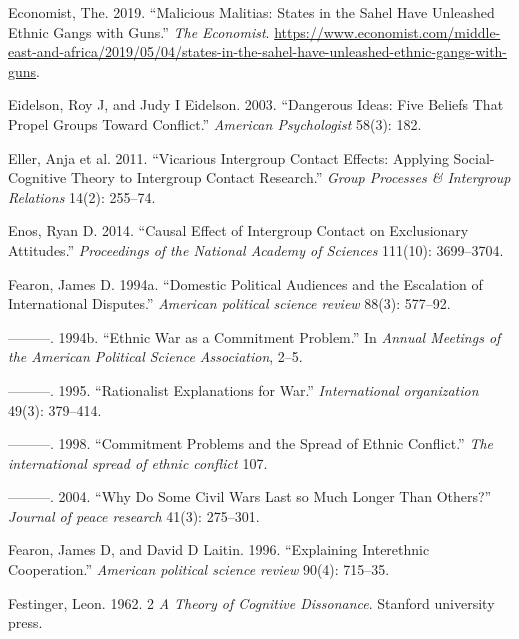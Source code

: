 \documentclass[11pt]{article}
\begin{document}
\leavevmode\hypertarget{ref-economist2019militias}{}%
Economist, The. 2019. ``Malicious Malitias: States in the Sahel Have
Unleashed Ethnic Gangs with Guns.'' \emph{The Economist}.
\url{https://www.economist.com/middle-east-and-africa/2019/05/04/states-in-the-sahel-have-unleashed-ethnic-gangs-with-guns}.

\leavevmode\hypertarget{ref-eidelson2003dangerous}{}%
Eidelson, Roy J, and Judy I Eidelson. 2003. ``Dangerous Ideas: Five
Beliefs That Propel Groups Toward Conflict.'' \emph{American
Psychologist} 58(3): 182.

\leavevmode\hypertarget{ref-mazziotta2011vicarious}{}%
Eller, Anja et al. 2011. ``Vicarious Intergroup Contact Effects:
Applying Social-Cognitive Theory to Intergroup Contact Research.''
\emph{Group Processes \& Intergroup Relations} 14(2): 255--74.

\leavevmode\hypertarget{ref-enos2014causal}{}%
Enos, Ryan D. 2014. ``Causal Effect of Intergroup Contact on
Exclusionary Attitudes.'' \emph{Proceedings of the National Academy of
Sciences} 111(10): 3699--3704.

\leavevmode\hypertarget{ref-fearon1994domestic}{}%
Fearon, James D. 1994a. ``Domestic Political Audiences and the
Escalation of International Disputes.'' \emph{American political science
review} 88(3): 577--92.

\leavevmode\hypertarget{ref-fearon1994ethnic}{}%
---------. 1994b. ``Ethnic War as a Commitment Problem.'' In
\emph{Annual Meetings of the American Political Science Association},
2--5.

\leavevmode\hypertarget{ref-fearon1995rationalist}{}%
---------. 1995. ``Rationalist Explanations for War.''
\emph{International organization} 49(3): 379--414.

\leavevmode\hypertarget{ref-fearon1998commitment}{}%
---------. 1998. ``Commitment Problems and the Spread of Ethnic
Conflict.'' \emph{The international spread of ethnic conflict} 107.

\leavevmode\hypertarget{ref-fearon2004civil}{}%
---------. 2004. ``Why Do Some Civil Wars Last so Much Longer Than
Others?'' \emph{Journal of peace research} 41(3): 275--301.

\leavevmode\hypertarget{ref-fearon1996explaining}{}%
Fearon, James D, and David D Laitin. 1996. ``Explaining Interethnic
Cooperation.'' \emph{American political science review} 90(4): 715--35.

\leavevmode\hypertarget{ref-festinger1962cognitiveDissonance}{}%
Festinger, Leon. 1962. 2 \emph{A Theory of Cognitive Dissonance}.
Stanford university press.
\end{document}
